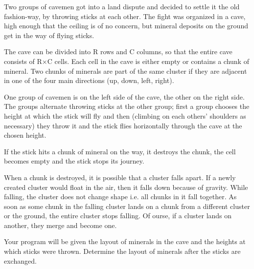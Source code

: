 Two groups of cavemen got into a land dispute and decided to settle it the old fashion-way, by throwing sticks at each other. The fight was organized in a cave, high enough that the ceiling is of no concern, but mineral deposits on the ground get in the way of flying sticks.  

   The cave can be divided into R rows and C columns, so that the entire cave consists of R×C cells. Each cell in the cave is either empty or contains a chunk of mineral. Two chunks of minerals are part of the same cluster if they are adjacent in one of the four main directions (up, down, left, right).  

   One group of cavemen is on the left side of the cave, the other on the right side. The groups alternate throwing sticks at the other group; first a group chooses the height at which the stick will fly and then (climbing on each others' shoulders as necessary) they throw it and the stick flies horizontally through the cave at the chosen height.  

   If the stick hits a chunk of mineral on the way, it destroys the chunk, the cell becomes empty and the stick stops its journey.  

   When a chunk is destroyed, it is possible that a cluster falls apart. If a newly created cluster would float in the air, then it falls down because of gravity. While falling, the cluster does not change shape i.e. all chunks in it fall together. As soon as some chunk in the falling cluster lands on a chunk from a different cluster or the ground, the entire cluster stops falling. Of  ourse, if a cluster lands on another, they merge and become one.  

   Your program will be given the layout of minerals in the cave and the heights at which sticks were thrown. Determine the layout of minerals after the sticks are exchanged.